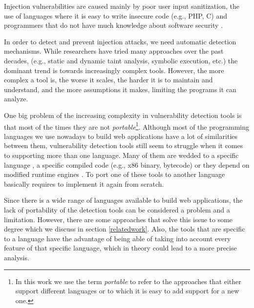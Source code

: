 Injection vulnerabilities are caused mainly by poor user input sanitization, the use of languages where it is easy to write insecure code (e.g., PHP, C) and programmers that do not have much knowledge about software security \cite{jain2011review}.

In order to detect and prevent injection attacks, we need automatic detection mechanisms.
While researchers have tried many approaches over the past decades, (e.g., static and dynamic taint analysis, symbolic execution, etc.) the dominant trend is towards increasingly complex tools. However, the more complex a tool is, the worse it scales, the harder it is to maintain and understand, and the more assumptions it makes, limiting the programs it can analyze. 

One big problem of the increasing complexity in vulnerability detection tools is that most of the times they are not \textit{portable}\footnote{In this work we use the term \textit{portable} to refer to the approaches that either support different languages or to which it is easy to add support for a new one.}. Although most of the programming languages we use nowadays to build web applications have a lot of similarities between them, vulnerability detection tools still seem to struggle when it comes to supporting more than one language. Many of them are wedded to a specific language \cite{diglossia,phpapis,jovanovic2006pixy, arzt2014flowdroid,nunes2015phpsafe,wassermann2008static, dahse2014simulation,livshits2005finding}, a specific compiled code \cite{dytan,taintcheck,dt++} (e.g., x86 binary, bytecode) or they depend on modified runtime engines \cite{diglossia,phosphor}. To port one of these tools to another language basically requires to implement it again from scratch. 

Since there is a wide range of languages available to build web applications, the lack of portability of the detection tools can be considered a problem and a limitation. However, there are some approaches that solve this issue to some degree which we discuss in section \ref{relatedwork}. Also, the tools that are specific to a language have the advantage of being able of taking into account every feature of that specific language, which in theory could lead to a more precise analysis.


